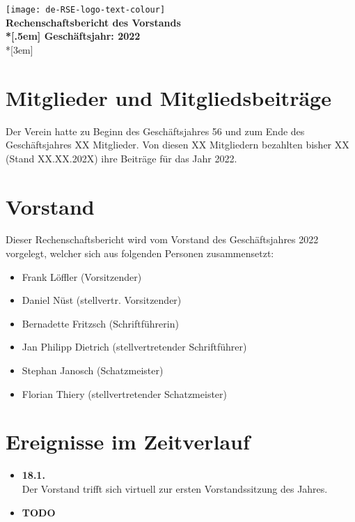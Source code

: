 \newcommand{\jahr}{2022}



\thispagestyle{empty}

\begin{centering}
\texttt{[image: de-RSE-logo-text-colour]}\\
\vspace{3em}
\textbf{
 \Large Rechenschaftsbericht des Vorstands\\*[.5em]
 \normalsize Geschäftsjahr: \jahr}\\*[3em]
\end{centering}

\section{Mitglieder und Mitgliedsbeiträge}

Der Verein hatte zu Beginn des Geschäftsjahres 56 und zum Ende des Geschäftsjahres XX Mitglieder. Von diesen XX Mitgliedern bezahlten bisher XX (Stand XX.XX.202X) ihre Beiträge für das Jahr 2022.

\section{Vorstand}

Dieser Rechenschaftsbericht wird vom Vorstand des Geschäftsjahres 2022 vorgelegt, welcher sich aus folgenden Personen zusammensetzt:

\begin{itemize}
  \setlength{\itemsep}{0pt plus 1pt}
  \item Frank Löffler (Vorsitzender)
  \item Daniel Nüst (stellvertr. Vorsitzender)
  \item Bernadette Fritzsch (Schriftführerin)
  \item Jan Philipp Dietrich (stellvertretender Schriftführer)
  \item Stephan Janosch (Schatzmeister)
  \item Florian Thiery (stellvertretender Schatzmeister)
\end{itemize}

\section{Ereignisse im Zeitverlauf}

\begin{itemize}
 \item \textbf{18.1.}\\Der Vorstand trifft sich virtuell zur ersten Vorstandssitzung des Jahres.
 \item \textbf{TODO}
\end{itemize}

